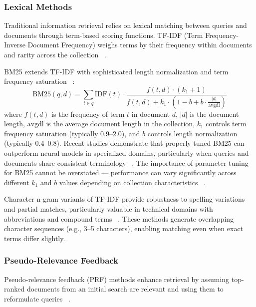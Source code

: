 \documentclass[preprint,12pt]{elsarticle}
\begin{document}
\subsubsection{Lexical Methods}

Traditional information retrieval relies on lexical matching between queries and documents through term-based scoring functions. TF-IDF (Term Frequency-Inverse Document Frequency) weighs terms by their frequency within documents and rarity across the collection ~\cite{salton1988term, manning2008introduction}.

BM25 extends TF-IDF with sophisticated length normalization and term frequency saturation ~\cite{robertson2009probabilistic}:
\begin{equation}
\text{BM25}(q,d) = \sum_{t \in q} \text{IDF}(t) \cdot \frac{f(t,d) \cdot (k_1 + 1)}{f(t,d) + k_1 \cdot (1 - b + b \cdot \frac{|d|}{\text{avgdl}})}
\end{equation}
where $f(t,d)$ is the frequency of term $t$ in document $d$, $|d|$ is the document length, $\text{avgdl}$ is the average document length in the collection, $k_1$ controls term frequency saturation (typically 0.9--2.0), and $b$ controls length normalization (typically 0.4--0.8). Recent studies demonstrate that properly tuned BM25 can outperform neural models in specialized domains, particularly when queries and documents share consistent terminology ~\cite{thakur2021beir}. The importance of parameter tuning for BM25 cannot be overstated --- performance can vary significantly across different $k_1$ and $b$ values depending on collection characteristics ~\cite{trotmanImprovementsBM25Language2014}.

Character n-gram variants of TF-IDF provide robustness to spelling variations and partial matches, particularly valuable in technical domains with abbreviations and compound terms ~\cite{mcnameeCharacterNGramTokenization2004}. These methods generate overlapping character sequences (e.g., 3--5 characters), enabling matching even when exact terms differ slightly.

\subsubsection{Pseudo-Relevance Feedback}

Pseudo-relevance feedback (PRF) methods enhance retrieval by assuming top-ranked documents from an initial search are relevant and using them to reformulate queries ~\cite{rocchio1971relevance}.
\end{document}
